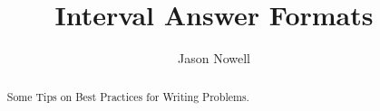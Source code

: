 \documentclass{ximera}
\title{Interval Answer Formats}
\author{Jason Nowell}
\begin{document}
\begin{abstract}
Some Tips on Best Practices for Writing Problems.
\end{abstract}
\maketitle
\end{document}
